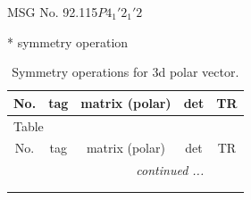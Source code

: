 \documentclass[fleqn,8pt]{jsarticle}
\begin{document}
\setcounter{MaxMatrixCols}{32}

\renewcommand{\tablename}{Table~}
\renewcommand{\figurename}{Figure~}
\begin{center}
\LARGE
MSG No. 92.115\quad$P4_{1}'2_{1}'2$
\end{center}
* symmetry operation
\renewcommand{\arraystretch}{1.3}
\begin{longtable}{ccccc}
\caption{Symmetry operations for 3d polar vector.}
 \\
 \hline \hline
No. & tag & matrix (polar) & det & TR \\ \hline \endfirsthead

\multicolumn{4}{l}{\tablename\ \thetable{}} \\
 \hline \hline
No. & tag & matrix (polar) & det & TR \\ \hline \endhead

 \hline \hline
\multicolumn{4}{r}{\footnotesize\it continued ...} \\ \endfoot

 \hline \hline
\multicolumn{4}{r}{} \\ \endlastfoot


\end{longtable}
\end{document}
